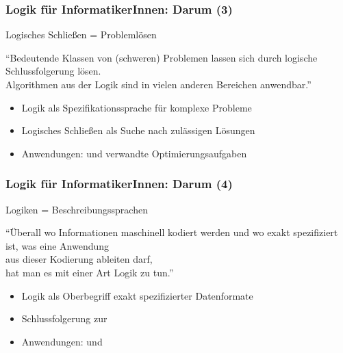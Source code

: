 \documentclass[aspectratio=1610,onlymath]{beamer}
\begin{document}
\begin{frame}\frametitle{Logik für InformatikerInnen: Darum (3)}

\begin{center}
\LARGE 
Logisches Schließen = Problemlösen

\bigskip
\large
"`Bedeutende Klassen von (schweren) Problemen lassen sich durch logische Schlussfolgerung lösen.\\
Algorithmen aus der Logik sind in vielen anderen Bereichen anwendbar."'
\end{center}


\begin{itemize}
\item Logik als Spezifikationssprache für komplexe Probleme
\item Logisches Schließen als Suche nach zulässigen Lösungen
\item Anwendungen:  und verwandte Optimierungsaufgaben
\end{itemize}

\end{frame}

\begin{frame}\frametitle{Logik für InformatikerInnen: Darum (4)}

\begin{center}
\LARGE 
Logiken = Beschreibungssprachen

\bigskip
\large
"`Überall wo Informationen maschinell kodiert werden und wo exakt spezifiziert ist, was eine Anwendung\\ aus dieser Kodierung ableiten darf,\\hat man es mit einer Art Logik zu tun."'
\end{center}


\begin{itemize}
\item Logik als Oberbegriff exakt spezifizierter Datenformate
\item Schlussfolgerung zur 
\item Anwendungen:  und 
\end{itemize}
\end{frame}
\end{document}
